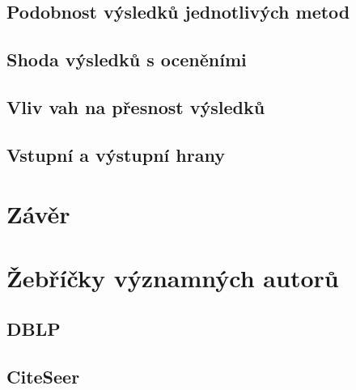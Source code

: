 \documentclass[12pt,titlepage]{report}
\begin{document}
\section{Podobnost výsledků jednotlivých metod}
\section{Shoda výsledků s oceněními}
\section{Vliv vah na přesnost výsledků}
\section{Vstupní a výstupní hrany}

\chapter{Závěr}




\clearpage\mbox{}\clearpage

\newpage
\appendix
\chapter{Žebříčky významných autorů}
\label{chapter:zebricky}

\newpage
\section{DBLP}












\section{CiteSeer}
\begin{footnotesize}
\end{footnotesize}
\end{document}
